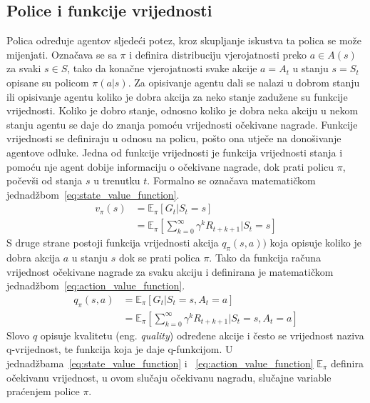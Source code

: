 \subsection{Police i funkcije vrijednosti}
Polica određuje agentov sljedeći potez, kroz skupljanje iskustva ta polica se može mijenjati. Označava se sa $\pi$ i definira distribuciju vjerojatnosti preko $a \in A(s)$ za svaki $s \in S$, tako da konačne vjerojatnosti svake akcije $a = A_t$ u stanju $s = S_t$ opisane su policom $\pi(a|s)$.
Za opisivanje agentu dali se nalazi u dobrom stanju ili opisivanje agentu koliko je dobra akcija za neko stanje zadužene su funkcije vrijednosti. Koliko je dobro stanje, odnosno koliko je dobra neka akciju u nekom stanju agentu se daje do znanja pomoću vrijednosti očekivane nagrade. Funkcije vrijednosti se definiraju u odnosu na policu, pošto ona utječe na donošivanje agentove odluke.
Jedna od funkcije vrijednosti je funkcija vrijednosti stanja i pomoću nje agent dobije informaciju o očekivane nagrade, dok prati policu $\pi$, počevši od stanja $s$ u trenutku $t$. Formalno se označava matematičkom jednadžbom~\ref{eq:state_value_function}.
\begin{equation}\label{eq:state_value_function}
	\begin{split}
		v_\pi(s) &= \mathbb{E}_\pi[G_t | S_t = s] \\
				 &= \mathbb{E}_\pi\left[\sum_{k=0}^{\infty} \gamma^k R_{t+k+1} | S_t = s\right]
     \end{split}
\end{equation}
S druge strane postoji funkcija vrijednosti akcija $q_\pi(s, a))$ koja opisuje koliko je dobra akcija $a$ u stanju $s$ dok se prati polica $\pi$. Tako da funkcija računa vrijednost očekivane nagrade za svaku akciju i definirana je matematičkom jednadžbom~\ref{eq:action_value_function}.
\begin{equation}\label{eq:action_value_function}
\begin{split}
q_\pi(s, a) &= \mathbb{E}_\pi[G_t | S_t = s, A_t = a] \\
&= \mathbb{E}_\pi\left[\sum_{k=0}^{\infty} \gamma^k R_{t+k+1} | S_t = s, A_t = a\right]
\end{split}
\end{equation}
Slovo $q$ opisuje kvalitetu (eng. \textit{quality}) određene akcije i često se vrijednost naziva q-vrijednost, te funkcija koja je daje q-funkcijom. U jednadžbama~\ref{eq:state_value_function} i ~\ref{eq:action_value_function} $\mathbb{E}_\pi$ definira očekivanu vrijednost, u ovom slučaju očekivanu nagradu, slučajne variable praćenjem police $\pi$.

